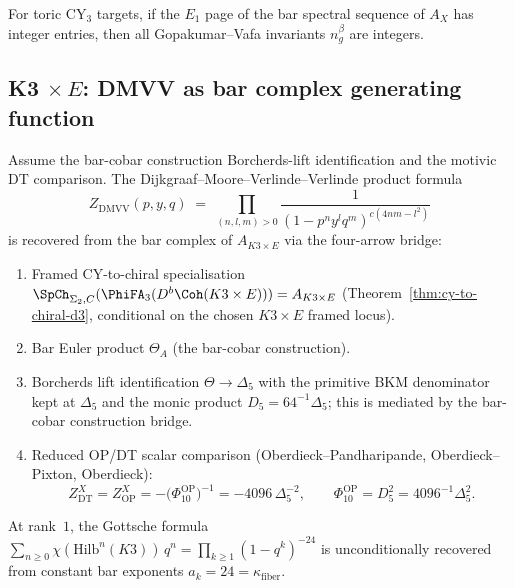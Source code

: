 \begin{proposition}
\label{prop:gv-integrality-bar}
For toric CY$_3$ targets, if the $E_1$ page of the bar spectral sequence
of $A_X$ has integer entries, then all Gopakumar--Vafa invariants
$n_g^\beta$ are integers.
\end{proposition}

\subsection{K3 \texorpdfstring{$\times\, E$}{x E}: DMVV as bar complex generating function}
\label{subsec:k3e-dmvv-bar}

\begin{conjecture}
\label{conj:dmvv-bar}
\ClaimStatusConjectured
Assume the bar-cobar construction Borcherds-lift identification and the motivic DT
comparison.
The Dijkgraaf--Moore--Verlinde--Verlinde product formula \cite{DMVV}
\[
 Z_{\mathrm{DMVV}}(p,y,q) \;=\; \prod_{(n,l,m) > 0} \frac{1}{(1 - p^n y^l q^m)^{c(4nm - l^2)}}
\]
is recovered from the bar complex of $A_{K3 \times E}$ via the four-arrow bridge:
\begin{enumerate}[label=\textup{(\roman*)}]
 \item Framed CY-to-chiral specialisation $\SpCh_{\Sigma_2,C}(\PhiFA_3(D^b\Coh(K3 \times E))) = A_{K3 \times E}$ \textup{(}Theorem~\ref{thm:cy-to-chiral-d3}, conditional on the chosen $K3\times E$ framed locus\textup{)}.
 \item Bar Euler product $\Theta_A$ \textup{(}the bar-cobar construction\textup{)}.
 \item Borcherds lift identification $\Theta \to \Delta_5$ with the
 primitive BKM denominator kept at $\Delta_5$ and the monic product
 \(D_5=64^{-1}\Delta_5\); this is mediated by the bar-cobar construction bridge.
 \item Reduced OP/DT scalar comparison
 \textup{(}Oberdieck--Pandharipande, Oberdieck--Pixton, Oberdieck\textup{)}:
 \[
 Z^X_{\mathrm{DT}}=Z^X_{\mathrm{OP}}
 =-\bigl(\Phi_{10}^{\mathrm{OP}}\bigr)^{-1}
 =-4096\,\Delta_5^{-2},
 \qquad
 \Phi_{10}^{\mathrm{OP}}=D_5^2=4096^{-1}\Delta_5^2.
 \]
\end{enumerate}
At rank~$1$, the Gottsche formula $\sum_{n \geq 0} \chi(\mathrm{Hilb}^n(K3))\, q^n = \prod_{k \geq 1} (1 - q^k)^{-24}$ is unconditionally recovered from constant bar exponents $a_k = 24 = \kappa_{\mathrm{fiber}}$.
\end{conjecture}

